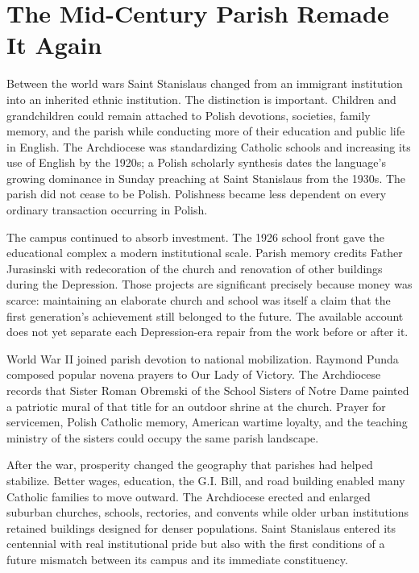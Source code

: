 \section{The Mid-Century Parish Remade It Again}

Between the world wars Saint Stanislaus changed from an immigrant institution into an inherited ethnic institution. The distinction is important. Children and grandchildren could remain attached to Polish devotions, societies, family memory, and the parish while conducting more of their education and public life in English. The Archdiocese was standardizing Catholic schools and increasing its use of English by the 1920s; a Polish scholarly synthesis dates the language's growing dominance in Sunday preaching at Saint Stanislaus from the 1930s. The parish did not cease to be Polish. Polishness became less dependent on every ordinary transaction occurring in Polish.

The campus continued to absorb investment. The 1926 school front gave the educational complex a modern institutional scale. Parish memory credits Father Jurasinski with redecoration of the church and renovation of other buildings during the Depression. Those projects are significant precisely because money was scarce: maintaining an elaborate church and school was itself a claim that the first generation's achievement still belonged to the future. The available account does not yet separate each Depression-era repair from the work before or after it.

World War II joined parish devotion to national mobilization. Raymond Punda composed popular novena prayers to Our Lady of Victory. The Archdiocese records that Sister Roman Obremski of the School Sisters of Notre Dame painted a patriotic mural of that title for an outdoor shrine at the church. Prayer for servicemen, Polish Catholic memory, American wartime loyalty, and the teaching ministry of the sisters could occupy the same parish landscape.

After the war, prosperity changed the geography that parishes had helped stabilize. Better wages, education, the G.I. Bill, and road building enabled many Catholic families to move outward. The Archdiocese erected and enlarged suburban churches, schools, rectories, and convents while older urban institutions retained buildings designed for denser populations. Saint Stanislaus entered its centennial with real institutional pride but also with the first conditions of a future mismatch between its campus and its immediate constituency.

